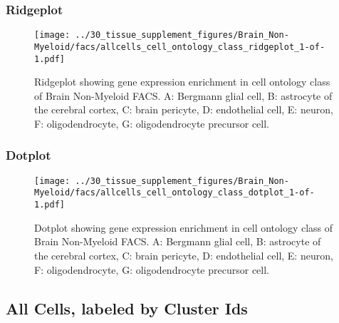 \newpage
\newpage
\subsubsection{Ridgeplot}
\begin{figure}[h]
\centering
\texttt{[image: ../30\_tissue\_supplement\_figures/Brain\_Non-Myeloid/facs/allcells\_cell\_ontology\_class\_ridgeplot\_1-of-1.pdf]}

\caption{ Ridgeplot  showing gene expression enrichment in cell ontology class of Brain Non-Myeloid FACS. A: Bergmann glial cell, B: astrocyte of the cerebral cortex, C: brain pericyte, D: endothelial cell, E: neuron, F: oligodendrocyte, G: oligodendrocyte precursor cell.}
\end{figure}


\newpage
\newpage
\subsubsection{Dotplot}
\begin{figure}[h]
\centering
\texttt{[image: ../30\_tissue\_supplement\_figures/Brain\_Non-Myeloid/facs/allcells\_cell\_ontology\_class\_dotplot\_1-of-1.pdf]}

\caption{ Dotplot  showing gene expression enrichment in cell ontology class of Brain Non-Myeloid FACS. A: Bergmann glial cell, B: astrocyte of the cerebral cortex, C: brain pericyte, D: endothelial cell, E: neuron, F: oligodendrocyte, G: oligodendrocyte precursor cell.}
\end{figure}


\newpage
\subsection{All Cells, labeled by Cluster Ids}
